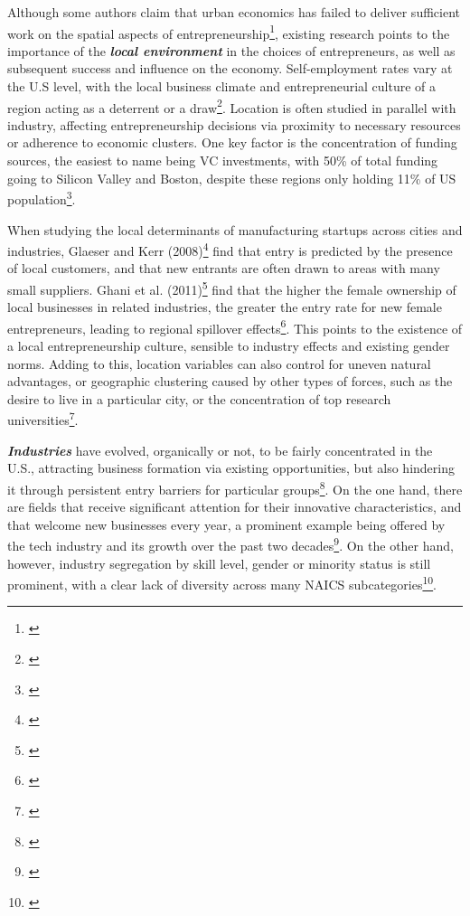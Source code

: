 Although some authors claim that urban economics has failed to deliver sufficient work on the spatial aspects of entrepreneurship\footnote{\cite{GlaeserRosenthalStrange2009}}, existing research points to the importance of the \textbf{\textit{local environment}} in the choices of entrepreneurs, as well as subsequent success and influence on the economy. Self-employment rates vary at the U.S level, with the local business climate and entrepreneurial culture of a region acting as a deterrent or a draw\footnote{\cite{PatrickStephensWeinstein2016}}. Location is often studied in parallel with industry, affecting entrepreneurship decisions via proximity to necessary resources or adherence to economic clusters. One key factor is the concentration of funding sources, the easiest to name being VC investments, with 50\% of total funding going to Silicon Valley and Boston, despite these regions only holding 11\% of US population\footnote{\cite{ChatterjiGlaeserKerr2014}}. 

When studying the local determinants of manufacturing startups across cities and industries, Glaeser and Kerr (2008)\footnote{\cite{GlaeserKerr2008}} find that entry is predicted by the presence of local customers, and that new entrants are often drawn to areas with many small suppliers. Ghani et al. (2011)\footnote{\cite{GhaniKerrOConnell2011}} find that the higher the female ownership of local businesses in related industries, the greater the entry rate for new female entrepreneurs, leading to regional spillover effects\footnote{\cite{GhaniKerrOConnell2011}}. This points to the existence of a local entrepreneurship culture, sensible to industry effects and existing gender norms. Adding to this, location variables can also control for uneven natural advantages, or geographic clustering caused by other types of forces, such as the desire to live in a particular city, or the concentration of top research universities\footnote{\cite{ChatterjiGlaeserKerr2014}}. 

\textit{\textbf{Industries}} have evolved, organically or not, to be fairly concentrated in the U.S., attracting business formation via existing opportunities, but also hindering it through persistent entry barriers for particular groups\footnote{\cite{ChatterjiGlaeserKerr2014}}. On the one hand, there are fields that receive significant attention for their innovative characteristics, and that welcome new businesses every year, a prominent example being offered by the tech industry and its growth over the past two decades\footnote{\cite{Berman2014}}. On the other hand, however,  industry segregation by skill level, gender or minority status is still prominent, with a clear lack of diversity across many NAICS subcategories\footnote{\cite{cartwright2011job}}. 


